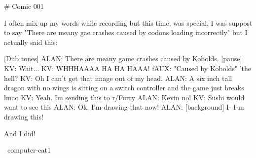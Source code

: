 # Comic 001

I often mix up my words while recording but this time, was special.
I was suppost to say "There are meany gae crashes caused by codons loading incorrectly" but I
actually said this:

[Dub tones]
ALAN: There are meany game crashes caused by Kobolds.
      [pause]
  KV: Wait...
  KV: WHHHAAAA  HA HA HAAA!
fAUX: "Caused by Kobolds" 'the hell?
  KV: Oh I can't get that image out of my head.
ALAN: A six inch tall dragon with no wings is sitting on a switch controller and the game just breaks lmao
  KV: Yeah. Im sending this to r/Furry
ALAN: Kevin no!
  KV: Sushi would want to see this
ALAN: Ok, I'm drawing that now!
ALAN: [background] I- I-m drawing this!

And I did!

~computer-cat1
